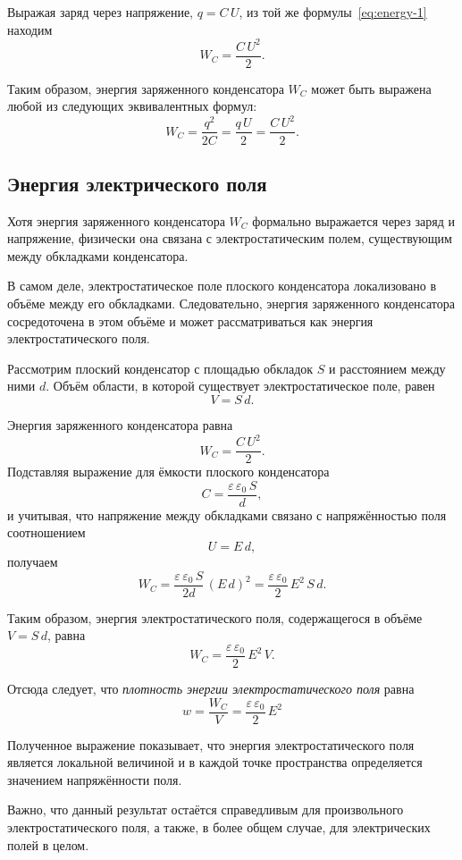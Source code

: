 \documentclass[14pt,a4paper,oneside]{extreport}
\theoremstyle{definition}
\begin{document}
Выражая заряд через напряжение, $q = C\,U$, из той же формулы~\eqref{eq:energy-1}
находим
\begin{equation}
W_C = \frac{C\,U^2}{2}.
\label{eq:energy-3}
\end{equation}

Таким образом, энергия заряженного конденсатора $W_C$ может быть выражена
любой из следующих эквивалентных формул:
\begin{equation}
\boxed{
W_C = \frac{q^2}{2C}
     = \frac{q\,U}{2}
     = \frac{C\,U^2}{2}.
}
\end{equation}

\subsection*{Энергия электрического поля}

Хотя энергия заряженного конденсатора $W_C$ формально выражается через заряд и напряжение,
физически она связана с электростатическим полем,
существующим между обкладками конденсатора.

В самом деле, электростатическое поле плоского конденсатора
локализовано в объёме между его обкладками.
Следовательно, энергия заряженного конденсатора
сосредоточена в этом объёме и может рассматриваться
как энергия электростатического поля.

Рассмотрим плоский конденсатор с площадью обкладок $S$
и расстоянием между ними $d$.
Объём области, в которой существует электростатическое поле, равен
\[
V = S\,d.
\]

Энергия заряженного конденсатора равна
\[
W_C = \frac{C\,U^2}{2}.
\]
Подставляя выражение для ёмкости плоского конденсатора
\[
C = \frac{\varepsilon\,\varepsilon_0\,S}{d},
\]
и учитывая, что напряжение между обкладками связано
с напряжённостью поля соотношением
\[
U = E\,d,
\]
получаем
\[
W_C
= \frac{\varepsilon\,\varepsilon_0\,S}{2d}\,(E\,d)^2
= \frac{\varepsilon\,\varepsilon_0}{2}\,E^2\,S\,d.
\]

Таким образом, энергия электростатического поля,
содержащегося в объёме $V = S\,d$, равна
\[
W_C = \frac{\varepsilon\,\varepsilon_0}{2}\,E^2\,V.
\]

Отсюда следует, что \textit{плотность энергии электростатического поля}
равна
\begin{equation}
  \boxed{
  w = \frac{W_C}{V}
  = \frac{\varepsilon\,\varepsilon_0}{2}\,E^2 }
\end{equation}

Полученное выражение показывает,
что энергия электростатического поля является локальной величиной
и в каждой точке пространства определяется значением напряжённости поля.

Важно, что данный результат остаётся справедливым
для произвольного электростатического поля,
а также, в более общем случае, для электрических полей в целом.
\end{document}
